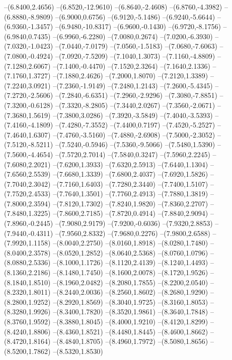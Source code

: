 {\begin{scope}
--(6.8400,2.4656)
--(6.8520,-12.9610)
--(6.8640,-2.4608)
--(6.8760,-4.3982)
--(6.8880,-8.9809)
--(6.9000,0.6756)
--(6.9120,-5.1486)
--(6.9240,-5.6644)
--(6.9360,-1.3457)
--(6.9480,-10.8317)
--(6.9600,-0.1430)
--(6.9720,-8.1756)
--(6.9840,0.7435)
--(6.9960,-6.2280)
--(7.0080,0.2674)
--(7.0200,-6.3930)
--(7.0320,-1.0423)
--(7.0440,-7.0179)
--(7.0560,-1.5183)
--(7.0680,-7.6063)
--(7.0800,-0.4924)
--(7.0920,-7.5209)
--(7.1040,1.3073)
--(7.1160,-4.8809)
--(7.1280,2.6067)
--(7.1400,-0.4470)
--(7.1520,2.3264)
--(7.1640,2.1336)
--(7.1760,1.3727)
--(7.1880,2.4626)
--(7.2000,1.8070)
--(7.2120,1.3389)
--(7.2240,3.0921)
--(7.2360,-1.9149)
--(7.2480,1.2143)
--(7.2600,-5.4345)
--(7.2720,-2.5606)
--(7.2840,-6.6351)
--(7.2960,-2.9296)
--(7.3080,-7.8851)
--(7.3200,-0.6128)
--(7.3320,-8.2805)
--(7.3440,2.0267)
--(7.3560,-2.0671)
--(7.3680,1.5619)
--(7.3800,3.0286)
--(7.3920,-3.5849)
--(7.4040,-3.5393)
--(7.4160,-4.1809)
--(7.4280,-7.3552)
--(7.4400,0.7197)
--(7.4520,-5.2527)
--(7.4640,1.6307)
--(7.4760,-3.5160)
--(7.4880,-2.6908)
--(7.5000,-2.3052)
--(7.5120,-8.5211)
--(7.5240,-0.5946)
--(7.5360,-9.5066)
--(7.5480,1.5390)
--(7.5600,-4.4654)
--(7.5720,2.7014)
--(7.5840,0.3247)
--(7.5960,2.2245)
--(7.6080,2.2021)
--(7.6200,1.3933)
--(7.6320,2.5913)
--(7.6440,1.1304)
--(7.6560,2.5539)
--(7.6680,1.3339)
--(7.6800,2.4037)
--(7.6920,1.5826)
--(7.7040,2.3042)
--(7.7160,1.6403)
--(7.7280,2.3440)
--(7.7400,1.5107)
--(7.7520,2.4533)
--(7.7640,1.3501)
--(7.7760,2.4913)
--(7.7880,1.3819)
--(7.8000,2.3594)
--(7.8120,1.7302)
--(7.8240,1.9820)
--(7.8360,2.2707)
--(7.8480,1.3225)
--(7.8600,2.7185)
--(7.8720,0.4914)
--(7.8840,2.9094)
--(7.8960,-0.2445)
--(7.9080,2.9179)
--(7.9200,-0.6036)
--(7.9320,2.8853)
--(7.9440,-0.4311)
--(7.9560,2.8332)
--(7.9680,0.2276)
--(7.9800,2.6588)
--(7.9920,1.1158)
--(8.0040,2.2750)
--(8.0160,1.8918)
--(8.0280,1.7480)
--(8.0400,2.3578)
--(8.0520,1.2852)
--(8.0640,2.5368)
--(8.0760,1.0796)
--(8.0880,2.5336)
--(8.1000,1.1726)
--(8.1120,2.4139)
--(8.1240,1.4493)
--(8.1360,2.2186)
--(8.1480,1.7450)
--(8.1600,2.0078)
--(8.1720,1.9526)
--(8.1840,1.8510)
--(8.1960,2.0482)
--(8.2080,1.7855)
--(8.2200,2.0540)
--(8.2320,1.8011)
--(8.2440,2.0036)
--(8.2560,1.8602)
--(8.2680,1.9290)
--(8.2800,1.9252)
--(8.2920,1.8569)
--(8.3040,1.9725)
--(8.3160,1.8053)
--(8.3280,1.9926)
--(8.3400,1.7820)
--(8.3520,1.9861)
--(8.3640,1.7848)
--(8.3760,1.9592)
--(8.3880,1.8045)
--(8.4000,1.9210)
--(8.4120,1.8299)
--(8.4240,1.8806)
--(8.4360,1.8521)
--(8.4480,1.8445)
--(8.4600,1.8662)
--(8.4720,1.8164)
--(8.4840,1.8705)
--(8.4960,1.7972)
--(8.5080,1.8656)
--(8.5200,1.7862)
--(8.5320,1.8530)

\end{scope}}
